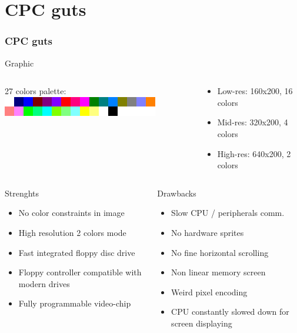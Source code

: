 \documentclass{beamer}
\begin{document}
\section{CPC guts}
  \begin{frame}
    \frametitle{CPC guts}
    \begin{block}{Graphic}
      \begin{columns}[c]
	\begin{column}{.5\linewidth}
	  27 colors palette:
	  \includegraphics[width=\linewidth]{imgs/amstradcpc.png}
	\end{column}

	\begin{column}{.5\linewidth}
	  \begin{itemize} 
	    \item Low-res: 160x200, 16 colors
	    \item Mid-res: 320x200, 4 colors
	    \item High-res: 640x200, 2 colors
	  \end{itemize}
	\end{column}
      \end{columns}
    \end{block}

    \begin{columns}[t]
      \begin{column}{.5\linewidth}
	\begin{block}{Strenghts}
	  \begin{itemize}
	    \item No color constraints in image
	    \item High resolution 2 colors mode
	    \item Fast integrated floppy disc drive
	    \item Floppy controller compatible with modern drives
	    \item Fully programmable video-chip
	  \end{itemize}
	\end{block}
      \end{column}

      \begin{column}{.5\linewidth}
	\begin{block}{Drawbacks}
	  \begin{itemize}
	    \item Slow CPU / peripherals comm.
	    \item No hardware sprites
	    \item No fine horizontal scrolling
	    \item Non linear memory screen
	    \item Weird pixel encoding
	    \item CPU constantly slowed down for screen displaying
	  \end{itemize}
	\end{block}
      \end{column}
    \end{columns}




\end{frame}
\end{document}
